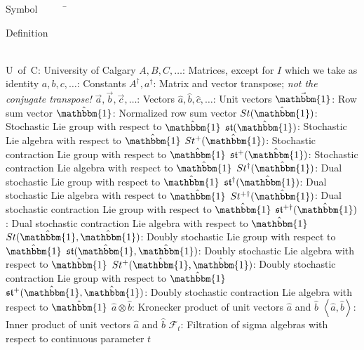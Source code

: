 \begin{tabbing}
	Symbol~~~~~\= \ \ \ \ \ \ \ \ \ \ \ \ \ \ \ \ \ \ \ \ \ \ \ \ \ \ \ \ \ \ \ \ \ \ \ \  \parbox{5in}{Definition}\\
	\addsymbol \mbox{U of C}: {University of Calgary}
	\addsymbol \mbox{$A,B,C,\dots$}: {Matrices, except for $I$ which we take as identity}
	\addsymbol \mbox{$a,b,c,\dots$}: {Constants}
	\addsymbol \mbox{$A^\dagger,a^\dagger$}: {Matrix and vector transpose; \emph{not the conjugate transpose!}}
	\addsymbol \mbox{$\vec{a},\vec{b},\vec{c},\dots$}: {Vectors}
	\addsymbol \mbox{$\hat{a},\hat{b},\hat{c},\dots$}: {Unit vectors}
	\addsymbol \mbox{$\vec{\mathbbm{1}}$}: {Row sum vector}
	\addsymbol \mbox{$\hat{\mathbbm{1}}$}: {Normalized row sum vector}
	\addsymbol \mbox{$St(\hat{\mathbbm{1}})$}: {Stochastic Lie group with respect to $\hat{\mathbbm{1}}$}
	\addsymbol \mbox{$\mathfrak{st}(\hat{\mathbbm{1}})$}: {Stochastic Lie algebra with respect to $\hat{\mathbbm{1}}$}
	\addsymbol \mbox{$St^{+}(\hat{\mathbbm{1}})$}: {Stochastic contraction Lie group with respect to $\hat{\mathbbm{1}}$}
	\addsymbol \mbox{$\mathfrak{st}^{+}(\hat{\mathbbm{1}})$}: {Stochastic contraction Lie algebra with respect to $\hat{\mathbbm{1}}$}
	\addsymbol \mbox{$St^\dagger(\hat{\mathbbm{1}})$}: {Dual stochastic Lie group with respect to $\hat{\mathbbm{1}}$}
	\addsymbol \mbox{$\mathfrak{st}^\dagger(\hat{\mathbbm{1}})$}: {Dual stochastic Lie algebra with respect to $\hat{\mathbbm{1}}$}
	\addsymbol \mbox{$St^{+\dagger}(\hat{\mathbbm{1}})$}: {Dual stochastic contraction Lie group with respect to $\hat{\mathbbm{1}}$}
	\addsymbol \mbox{$\mathfrak{st}^{+\dagger}(\hat{\mathbbm{1}})$}: {Dual stochastic contraction Lie algebra with respect to $\hat{\mathbbm{1}}$}
	\addsymbol \mbox{$St(\hat{\mathbbm{1}}, \hat{\mathbbm{1}})$}: {Doubly stochastic Lie group with respect to $\hat{\mathbbm{1}}$}
	\addsymbol \mbox{$\mathfrak{st}(\hat{\mathbbm{1}}, \hat{\mathbbm{1}})$}: {Doubly stochastic Lie algebra with respect to $\hat{\mathbbm{1}}$}
	\addsymbol \mbox{$St^{+}(\hat{\mathbbm{1}}, \hat{\mathbbm{1}})$}: {Doubly stochastic contraction Lie group with respect to $\hat{\mathbbm{1}}$}
	\addsymbol \mbox{$\mathfrak{st}^{+}(\hat{\mathbbm{1}}, \hat{\mathbbm{1}})$}: {Doubly stochastic contraction Lie algebra with respect to $\hat{\mathbbm{1}}$}
	\addsymbol \mbox{$\hat{a} \otimes \hat{b}$}: {Kronecker product of unit vectors $\hat{a}$ and $\hat{b}$}
	\addsymbol \mbox{$\left\langle \hat{a},\hat{b} \right\rangle$}: {Inner product of unit vectors $\hat{a}$ and $\hat{b}$}
	\addsymbol \mbox{$\mathscr{F}_t$}: {Filtration of sigma algebras with respect to continuous parameter $t$}

\end{tabbing}
